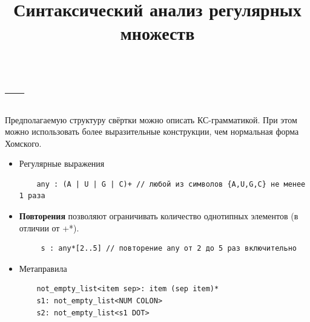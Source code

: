 \documentclass[a5paper]{article}
\title{Синтаксический анализ регулярных множеств}
\begin{document}




\section*{---}

Предполагаемую структуру свёртки можно описать КС-грамматикой. При этом можно использовать более выразительные конструкции, чем нормальная форма Хомского.

\begin{itemize}
    \item Регулярные выражения
        \begin{verbatim}
    any : (A | U | G | C)+ // любой из символов {A,U,G,C} не менее 1 раза
        \end{verbatim}
    \item \textbf{Повторения} позволяют ограничивать количество однотипных элементов (в отличии от +*). 
        \begin{verbatim}
     s : any*[2..5] // повторение any от 2 до 5 раз включительно
        \end{verbatim}
    \item Метаправила
        \begin{verbatim}
    not_empty_list<item sep>: item (sep item)*
    s1: not_empty_list<NUM COLON>
    s2: not_empty_list<s1 DOT>
        \end{verbatim}
\end{itemize}
\end{document}
